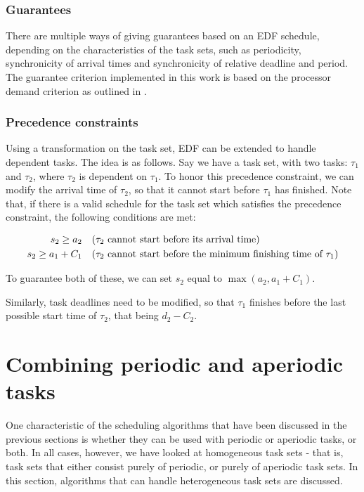 \documentclass[twoside]{uva-inf-bachelor-thesis}
\newcommand{\task}[1]{\ensuremath{\tau_#1}}
\begin{document}
\subsubsection{Guarantees}
There are multiple ways of giving guarantees based on an EDF schedule, depending on the characteristics of the task sets, such as periodicity, synchronicity of arrival times and synchronicity of relative deadline and period. The guarantee criterion implemented in this work is based on the processor demand criterion as outlined in \textcite{Baruah1990}.

\subsubsection{Precedence constraints}
Using a transformation on the task set, EDF can be extended to handle dependent tasks\cite{Chetto1990}. The idea is as follows. Say we have a task set, with two tasks: \task{1} and \task{2}, where \task{2} is dependent on \task{1}. To honor this precedence constraint, we can modify the arrival time of \task{2}, so that it cannot start before \task{1} has finished. Note that, if there is a valid schedule for the task set which satisfies the precedence constraint, the following conditions are met:

\begin{align}
    s_2 \ge a_2 \quad &\text{(\task{2} cannot start before its arrival time)}\\
    s_2 \ge a_1 + C_1 \quad &\text{(\task{2} cannot start before the minimum finishing time of \task{1})}
\end{align}

To guarantee both of these, we can set $s_2$ equal to $\max(a_2, a_1 + C_1)$.

Similarly, task deadlines need to be modified, so that \task{1} finishes before the last possible start time of \task{2}, that being $d_2 - C_2$.

\section{Combining periodic and aperiodic tasks}
One characteristic of the scheduling algorithms that have been discussed in the previous sections is whether they can be used with periodic or aperiodic tasks, or both. In all cases, however, we have looked at homogeneous task sets - that is, task sets that either consist purely of periodic, or purely of aperiodic task sets. In this section, algorithms that can handle heterogeneous task sets are discussed.
\end{document}
